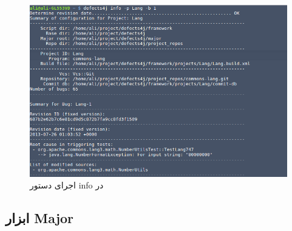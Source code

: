 \begin{figure}[H]
	\centering
	\includegraphics[width=.8\textwidth]{img/case_study/d4j-info-commadn.png}
	\caption{اجرای دستور info در }
	\label{fig:d4j-info-command}
\end{figure}

\subsection{ابزار Major}
\label{sec:tools-major}

